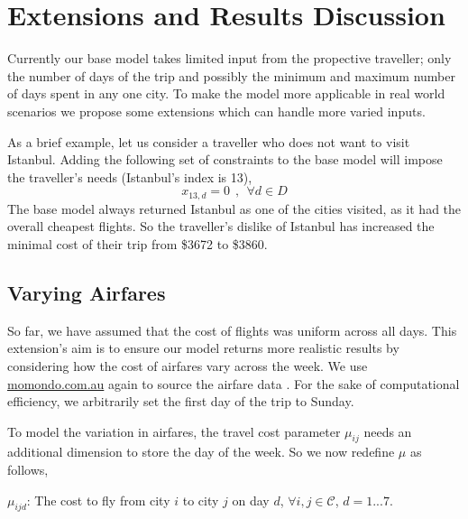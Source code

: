 \documentclass[12pt]{article}
\begin{document}
\clearpage
\newpage


\section{Extensions and Results Discussion} 
\label{sec:extensions}


Currently our base model takes limited input from the propective traveller; only the number of days of the trip and possibly the minimum and maximum number of days spent in any one city. To make the model more applicable in real world scenarios we propose some extensions which can handle more varied inputs.

As a brief example, let us consider a traveller who does not want to visit Istanbul. Adding the following set of constraints to the base model will impose the traveller's needs (Istanbul's index is 13),
$$	x_{13,d} = 0~~,~~ \forall d \in D	$$
The base model always returned Istanbul as one of the cities visited, as it had the overall cheapest flights. So the traveller's dislike of Istanbul has increased the minimal cost of their trip from \$3672 to \$3860.

\subsection{Varying Airfares}
So far, we have assumed that the cost of flights was uniform across all days. This extension's aim is to ensure our model returns more realistic results by considering how the cost of airfares vary across the week. We use \url{momondo.com.au} again to source the airfare data \cite{momondo}. For the sake of computational efficiency, we arbitrarily set the first day of the trip to Sunday.

To model the variation in airfares, the travel cost parameter $\mu_{ij}$ needs an additional dimension to store the day of the week. So we now redefine $\mu$ as follows,

$\mu_{ijd}$: The cost to fly from city $i$ to city $j$ on day $d$, $\forall i,j \in \mathcal{C}$, $d=1...7$.
\end{document}
